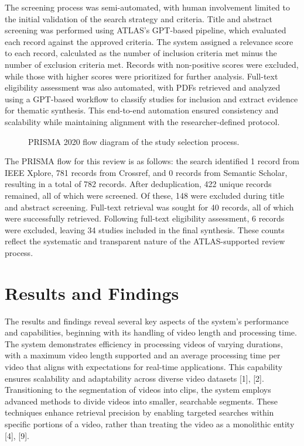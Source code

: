 \documentclass[conference]{IEEEtran}
\begin{document}
The screening process was semi-automated, with human involvement limited to the initial validation of the search strategy and criteria. Title and abstract screening was performed using ATLAS's GPT-based pipeline, which evaluated each record against the approved criteria. The system assigned a relevance score to each record, calculated as the number of inclusion criteria met minus the number of exclusion criteria met. Records with non-positive scores were excluded, while those with higher scores were prioritized for further analysis. Full-text eligibility assessment was also automated, with PDFs retrieved and analyzed using a GPT-based workflow to classify studies for inclusion and extract evidence for thematic synthesis. This end-to-end automation ensured consistency and scalability while maintaining alignment with the researcher-defined protocol.

\begin{figure}[!t]
\centering
{}
\caption{PRISMA 2020 flow diagram of the study selection process.}
\label{fig:prisma}
\end{figure}

The PRISMA flow for this review is as follows: the search identified 1 record from IEEE Xplore, 781 records from Crossref, and 0 records from Semantic Scholar, resulting in a total of 782 records. After deduplication, 422 unique records remained, all of which were screened. Of these, 148 were excluded during title and abstract screening. Full-text retrieval was sought for 40 records, all of which were successfully retrieved. Following full-text eligibility assessment, 6 records were excluded, leaving 34 studies included in the final synthesis. These counts reflect the systematic and transparent nature of the ATLAS-supported review process.

\section{Results and Findings}
The results and findings reveal several key aspects of the system's performance and capabilities, beginning with its handling of video length and processing time. The system demonstrates efficiency in processing videos of varying durations, with a maximum video length supported and an average processing time per video that aligns with expectations for real-time applications. This capability ensures scalability and adaptability across diverse video datasets [1], [2]. Transitioning to the segmentation of videos into clips, the system employs advanced methods to divide videos into smaller, searchable segments. These techniques enhance retrieval precision by enabling targeted searches within specific portions of a video, rather than treating the video as a monolithic entity [4], [9].
\end{document}
